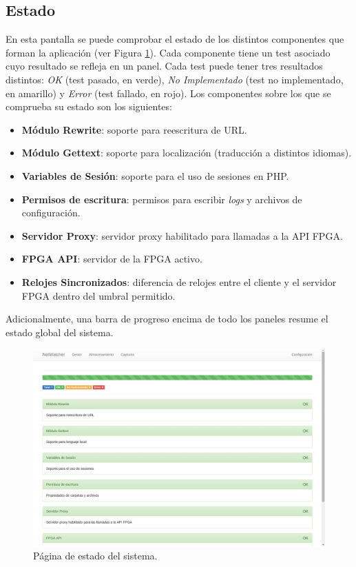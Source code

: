 \subsection{Estado\label{extra:manual:estado}}

En esta pantalla se puede comprobar el estado de los distintos componentes que forman la aplicación (ver Figura \ref{fig:captura:estado}). Cada componente tiene un test asociado cuyo resultado se refleja en un panel. Cada test puede tener tres resultados distintos: \textit{OK} (test pasado, en verde), \textit{No Implementado} (test no implementado, en amarillo) y \textit{Error} (test fallado, en rojo). Los componentes sobre los que se comprueba su estado son los siguientes:
\begin{itemize}
  \item \textbf{Módulo Rewrite}: soporte para reescritura de \gls{URL}.
  \item \textbf{Módulo Gettext}: soporte para localización (traducción a distintos idiomas).
  \item \textbf{Variables de Sesión}: soporte para el uso de sesiones en \gls{PHP}.
  \item \textbf{Permisos de escritura}: permisos para escribir \textit{logs} y archivos de configuración.
  \item \textbf{Servidor Proxy}: servidor proxy habilitado para llamadas a la API \gls{FPGA}.
  \item \textbf{\gls{FPGA} API}: servidor de la \gls{FPGA} activo.
  \item \textbf{Relojes Sincronizados}: diferencia de relojes entre el cliente y el servidor \gls{FPGA} dentro del umbral permitido.
\end{itemize}

Adicionalmente, una barra de progreso encima de todo los paneles resume el estado global del sistema.

\begin{figure}[!htp]
  \centering
  \includegraphics[width=\textwidth,clip=true]{graphics/capturas/estado}
  \caption{Página de estado del sistema.}
  \label{fig:captura:estado}
\end{figure}


